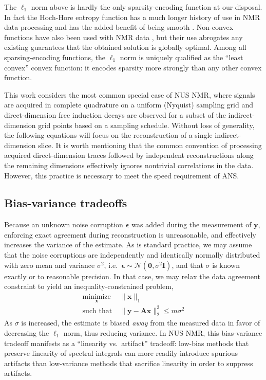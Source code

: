 \documentclass[final,5p,times,twocolumn]{elsarticle}
\newcommand{\m}[1]{\boldsymbol{#1}}
\begin{document}
The $\ell_1$ norm above is hardly the only sparsity-encoding function at our
disposal. In fact the Hoch-Hore entropy function has a much longer history
of use in NMR data processing \cite{hoch:jmr2017} and has the added benefit
of being smooth \cite{worley:jmr2016a}. Non-convex functions have also been
used with NMR data \cite{kazimierczuk:jmr2011,worley:ieeetsp2019}, but their
use abrogates any existing guarantees that the obtained solution is globally
optimal. Among all sparsing-encoding functions, the $\ell_1$ norm is uniquely
qualified as the ``least convex'' convex function: it encodes sparsity more
strongly than any other convex function.

This work considers the most common special case of NUS NMR, where signals
are acquired in complete quadrature on a uniform (Nyquist) sampling grid
and direct-dimension free induction decays are observed for a subset of
the indirect-dimension grid points based on a sampling schedule. Without
loss of generality, the following equations will focus on the reconstruction
of a single indirect-dimension slice. It is worth mentioning that the common
convention of processing acquired direct-dimension traces followed by
independent reconstructions along the remaining dimensions effectively
ignores nontrivial correlations in the data. However, this practice is
necessary to meet the speed requirement of ANS.

\subsection{Bias-variance tradeoffs}
\label{subsec:bvtrade}
Because an unknown noise corruption $\m{\epsilon}$ was added during the
measurement of $\m{y}$, enforcing exact agreement during reconstruction
is unreasonable, and effectively increases the variance of the estimate. As
is standard practice, we may assume that the noise corruptions are
independently and identically normally distributed with zero mean and
variance $\sigma^2$,
i.e.~$\m{\epsilon} \sim \mathcal{N}(\m{0}, \sigma^2 \m{I})$,
and that $\sigma$ is known exactly or to reasonable precision.
In that case, we may relax the data agreement constraint to yield an
inequality-constrained problem,
\begin{equation}
\begin{aligned}
 \underset{\m{x}}{\text{minimize}} &\; \|\m{x}\|_1 \\
 \text{such that} &\; \| \m{y} - \m{A} \m{x} \|_2^2 \le m \sigma^2
\end{aligned}
\label{eq:l1_ineq}
\end{equation}
As $\sigma$ is increased, the estimate is biased \emph{away} from the
measured data in favor of decreasing the $\ell_1$ norm, thus reducing
variance. In NUS NMR, this bias-variance tradeoff manifests as a
``linearity vs.~artifact'' tradeoff: low-bias methods that preserve
linearity of spectral integrals can more readily introduce spurious
artifacts than low-variance methods that sacrifice linearity in order
to suppress artifacts.
\end{document}
